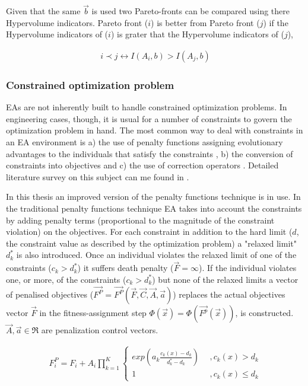 Given that the same $\vec{b}$ is used two Pareto-fronts can be compared using there Hypervolume indicators. Pareto front ($i$) is better from Pareto front ($j$) if the Hypervolume indicators of ($i$) is grater that the Hypervolume indicators of ($j$), 

\begin{eqnarray}
   i\prec j \leftrightarrow I(A_i,b) > I(A_j,b)
\end{eqnarray}    


\subsubsection{Constrained optimization problem}
EAs are not inherently built to handle constrained optimization problems. In engineering cases, though, it is usual for a number of constraints to govern the optimization problem in hand. The most common way to deal with constraints in an EA environment is a) the use of penalty functions \cite{Deb00,morales98} assigning evolutionary advantages to the individuals that satisfy the constraints \cite{powell93}, b) the conversion of constraints into objectives \cite{surry95,surry97} and c) the use of correction operators \cite{mich94}. Detailed literature survey on this subject can me found in \cite{mich96,coello02}.

In this thesis an improved version of the penalty functions technique is in use. In the traditional penalty functions technique EA takes into account the constraints by adding penalty terms (proportional to the magnitude of the constraint violation) on the objectives. For each constraint in addition to the hard limit ($d$, the constraint value as described by the optimization problem) a "relaxed limit" $d_k^*$ is also introduced. Once an individual violates the relaxed limit of one of the constraints ($c_k>d_k^*$) it suffers death penalty ($\vec{F} = \infty$). If the individual violates one, or more, of the constraints ($c_k>d_k^*$) but none of the relaxed limits a vector of penalised objectives ($\vec{F^P}=\vec{F^P}(\vec{F},\vec{C},\vec{A},\vec{a})$) replaces the actual objectives vector $\vec{F}$ in the fitness-assignment step $\Phi(\vec{x})=\Phi(\vec{F^p}(\vec{x}))$, is constructed. $\vec{A},\vec{a} \in \Re$ are penalization control vectors. 

\begin{eqnarray}
	F_i^P=F_i+A_i \prod _{k=1}^K{\left\{ \begin{array}{ll}
    exp(a_k\frac{c_k(x)-d_k}{d_k^* -d_k}) & ~~,c_k(x)>d_k\\
    1 & ~~,c_k(x)\leq d_k\end{array} \right. }
    \label{penal}
\end{eqnarray}  

